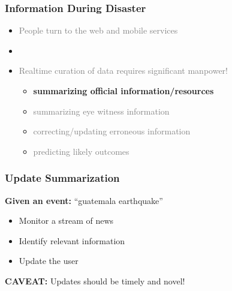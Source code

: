 \documentclass{beamer}
\newcommand{\light}[1]{\textcolor{gray}{#1}}
\begin{document}
\begin{frame}
\frametitle{Information During Disaster}
\begin{itemize}
\item \light{People turn to the web and mobile services}
\item[]
\item \light{Realtime curation of data requires significant manpower!}
\begin{itemize}
\item \textbf{summarizing official information/resources}
\item \light{summarizing eye witness information}
\item \light{correcting/updating erroneous information}
\item \light{predicting likely outcomes}
\end{itemize}
\end{itemize}
\end{frame}


\begin{frame}
\frametitle{Update Summarization}
\textbf{Given an event:} \pause ``guatemala earthquake''
\begin{itemize}
    \item{Monitor a stream of news}
    \item{Identify relevant information}
    \item{Update the user}
        
\end{itemize}
    \pause
    \textbf{CAVEAT:} Updates should be timely and novel! 
\end{frame}
\end{document}
